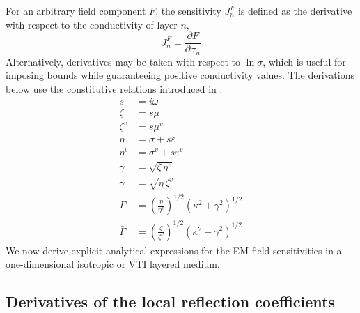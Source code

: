 \documentclass[12pt]{report}
\begin{document}
For an arbitrary field component \(F\), the sensitivity \(J_n^F\) is
defined as the derivative with respect to the conductivity of layer \(n\),
\begin{equation}
    J^F_n = \frac{\partial F}{\partial \sigma_n}
    \label{eq:1.1}
\end{equation}
Alternatively, derivatives may be taken with respect to \(\ln\sigma\),
which is useful for imposing bounds while guaranteeing positive
conductivity values. The derivations below use the constitutive relations
introduced in :
\begin{align}
    s     &= i\omega                                                              \label{eq:1.2}  \\
    \zeta &= s\mu                                                                 \label{eq:1.3}  \\
    \zeta^v &= s\mu^v                                                             \label{eq:1.4}  \\
    \eta  &= \sigma + s\varepsilon                                                \label{eq:1.5}  \\
    \eta^v &= \sigma^v + s\varepsilon^v                                           \label{eq:1.6}  \\
    \gamma  &= \sqrt{\zeta\,\eta^v}                                               \label{eq:1.7}  \\
    \bar{\gamma} &= \sqrt{\eta\,\zeta^v}                                          \label{eq:1.8}  \\
    \Gamma  &= \left(\frac{\eta}{\eta^v}\right)^{1/2}\!\left(\kappa^2+\gamma^2\right)^{1/2}
                                                                                  \label{eq:1.9}  \\
    \bar{\Gamma} &= \left(\frac{\zeta}{\zeta^v}\right)^{1/2}\!\left(\kappa^2+\bar{\gamma}^2\right)^{1/2}
                                                                                  \label{eq:1.10}
\end{align}
We now derive explicit analytical expressions for the EM-field
sensitivities in a one-dimensional isotropic or VTI layered medium.

\subsection{Derivatives of the local reflection coefficients}
\label{sec:local_refl}
\end{document}
